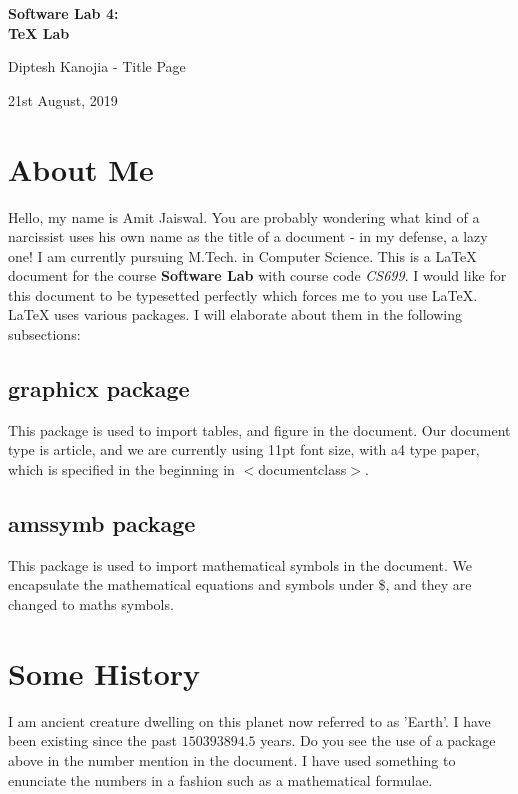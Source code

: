 \documentclass[12pt, a4paper]{article}
\begin{document}
 

\begin{titlepage}
\centering
    \vspace*{\fill}

    
    \Huge \textbf{Software Lab 4:\\TeX Lab}
    
    \vspace*{0.6cm}
    
    \LARGE{Diptesh Kanojia - Title Page}
    \vspace*{0.4cm}

    \Large{21st August, 2019}
    \vspace*{4.0cm}

    \vspace*{\fill}
\end{titlepage}

\setcounter{page}{1}
\tableofcontents

\clearpage

\section{About Me}
Hello, my name is Amit Jaiswal. You are probably wondering what
kind of a narcissist uses his own name as the title of a document - in
my defense, a lazy one! I am currently pursuing M.Tech. in Computer Science. This is a \LaTeX{} document for the course \textbf{Software Lab} with course code \emph{CS699}. I would like for this document to be typesetted perfectly which forces me to you use \LaTeX{}. \LaTeX{} uses various packages. I will elaborate about them in the following subsections:

\subsection{graphicx package}
This package is used to import tables, and figure in the document. Our
document type is article, and we are currently using 11pt font size, with
a4 type paper, which is specified in the beginning in $<$documentclass$>$.

\subsection{amssymb package}
This package is used to import mathematical symbols in the document.
We encapsulate the mathematical equations and symbols under \$, and
they are changed to maths symbols.

\section{Some History}
I am ancient creature dwelling on this planet now referred to as 'Earth'.
I have been existing since the past $150393894.5$ years. Do you see the
use of a package above in the number mention in the document. I
have used something to enunciate the numbers in a fashion such as a
mathematical formulae.
\end{document}
